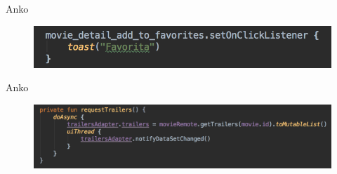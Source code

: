 \begin{frame}{Anko}{}
    \begin{figure}[h]
    \centering
    \includegraphics[width=\textwidth]{images/kotlin_android/anko_1}
    \end{figure}
\end{frame}

\begin{frame}{Anko}{}
    \begin{figure}[h]
    \centering
    \includegraphics[width=\textwidth]{images/kotlin_android/anko_2}
    \end{figure}
\end{frame}

